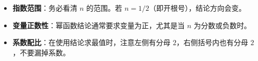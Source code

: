 \begin{trapbox}
\begin{itemize}
    \item \textbf{指数范围}：务必看清 $n$ 的范围。若 $n=1/2$（即开根号），结论方向会变。
    \item \textbf{变量正数性}：幂函数结论通常要求变量为正，尤其是当 $n$ 为分数或负数时。
    \item \textbf{系数配比}：在使用结论求最值时，注意左侧有分母 $2$，右侧括号内也有分母 $2$，不要漏掉系数。
\end{itemize}
\end{trapbox}